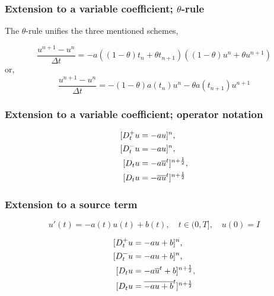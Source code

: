\documentclass{beamer}
\begin{document}
\begin{frame}
\frametitle{Extension to a variable coefficient; $\theta$-rule}

The $\theta$-rule unifies the three mentioned schemes,

\begin{equation}
\frac{u^{n+1} - u^{n}}{\Delta t} = -a((1-\theta)t_n + \theta t_{n+1})((1-\theta) u^n + \theta u^{n+1})
\end{equation}
or,
\begin{equation}
\frac{u^{n+1} - u^{n}}{\Delta t} = -(1-\theta) a(t_n)u^n - \theta
a(t_{n+1})u^{n+1}
\end{equation}
\end{frame}

\begin{frame}
\frametitle{Extension to a variable coefficient; operator notation}

\begin{align*}
\lbrack D^+_t u &= -au\rbrack^n,\\ 
\lbrack D^-_t u &= -au\rbrack^n,\\ 
\lbrack D_t u &= -a\overline{u}^t\rbrack^{n+\half},\\ 
\lbrack D_t u &= -\overline{au}^t\rbrack^{n+\half}\\ 
\end{align*}
\end{frame}

\begin{frame}
\frametitle{Extension to a source term}

\label{decay:source}

\begin{equation}
u'(t) = -a(t)u(t) + b(t),\quad t\in (0,T],\quad u(0)=I
\label{decay:problem:ab}
\end{equation}

\begin{align*}
\lbrack D^+_t u &= -au + b\rbrack^n,\\ 
\lbrack D^-_t u &= -au + b\rbrack^n,\\ 
\lbrack D_t u   &= -a\overline{u}^t + b\rbrack^{n+\half},\\ 
\lbrack D_t u   &= \overline{-au+b}^t\rbrack^{n+\half}
\end{align*}
\end{frame}
\end{document}
